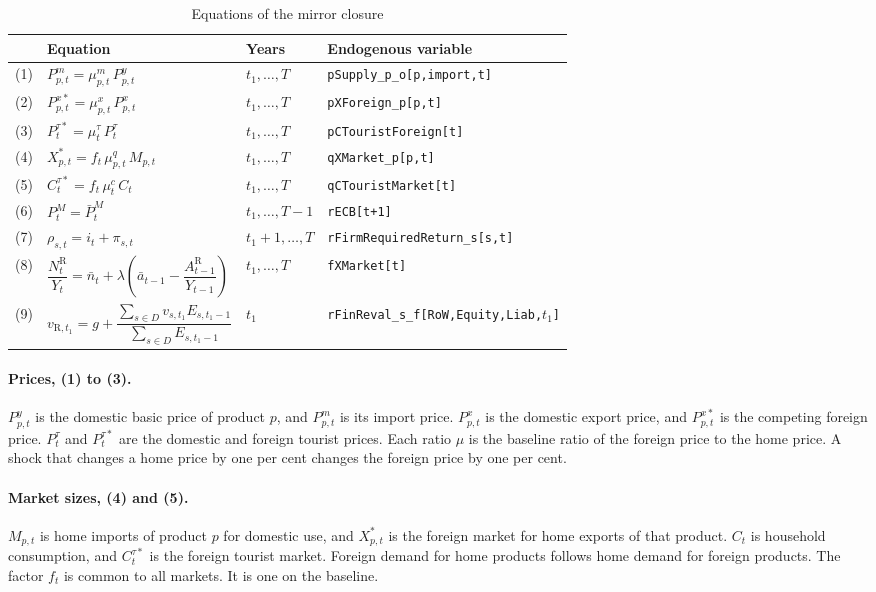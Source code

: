 \documentclass[11pt,a4paper]{article}
\newcommand{\code}[1]{\texttt{#1}}
\newcommand{\row}{\mathrm{R}}
\begin{document}
\begin{table}[ht]
\centering
\small
\caption{Equations of the mirror closure}
\label{tab:equations}
\begin{tabular}{@{}llll@{}}
\toprule
 & Equation & Years & Endogenous variable \\
\midrule
(1) & $P^{m}_{p,t} = \mu^{m}_{p,t}\, P^{y}_{p,t}$ & $t_1,\dots,T$ & \code{pSupply\_p\_o[p,import,t]} \\[2pt]
(2) & $P^{x*}_{p,t} = \mu^{x}_{p,t}\, P^{x}_{p,t}$ & $t_1,\dots,T$ & \code{pXForeign\_p[p,t]} \\[2pt]
(3) & $P^{\tau*}_{t} = \mu^{\tau}_{t}\, P^{\tau}_{t}$ & $t_1,\dots,T$ & \code{pCTouristForeign[t]} \\[2pt]
(4) & $X^{*}_{p,t} = f_t\, \mu^{q}_{p,t}\, M_{p,t}$ & $t_1,\dots,T$ & \code{qXMarket\_p[p,t]} \\[2pt]
(5) & $C^{\tau*}_{t} = f_t\, \mu^{c}_{t}\, C_{t}$ & $t_1,\dots,T$ & \code{qCTouristMarket[t]} \\[2pt]
(6) & $P^{M}_{t} = \bar{P}^{M}_{t}$ & $t_1,\dots,T-1$ & \code{rECB[t+1]} \\[2pt]
(7) & $\rho_{s,t} = i_t + \pi_{s,t}$ & $t_1+1,\dots,T$ & \code{rFirmRequiredReturn\_s[s,t]} \\[2pt]
(8) & $\dfrac{N^{\row}_t}{Y_t} = \bar{n}_t + \lambda \left( \bar{a}_{t-1} - \dfrac{A^{\row}_{t-1}}{Y_{t-1}} \right)$ & $t_1,\dots,T$ & \code{fXMarket[t]} \\[8pt]
(9) & $v_{\row,t_1} = g + \dfrac{\sum_{s \in D} v_{s,t_1} E_{s,t_1-1}}{\sum_{s \in D} E_{s,t_1-1}}$ & $t_1$ & \code{rFinReval\_s\_f[RoW,Equity,Liab,$t_1$]} \\
\bottomrule
\end{tabular}
\end{table}

\paragraph{Prices, (1) to (3).}
$P^{y}_{p,t}$ is the domestic basic price of product $p$, and $P^{m}_{p,t}$ is its import price.
$P^{x}_{p,t}$ is the domestic export price, and $P^{x*}_{p,t}$ is the competing foreign price.
$P^{\tau}_t$ and $P^{\tau*}_t$ are the domestic and foreign tourist prices.
Each ratio $\mu$ is the baseline ratio of the foreign price to the home price.
A shock that changes a home price by one per cent changes the foreign price by one per cent.

\paragraph{Market sizes, (4) and (5).}
$M_{p,t}$ is home imports of product $p$ for domestic use, and $X^{*}_{p,t}$ is the foreign market for home exports of that product.
$C_t$ is household consumption, and $C^{\tau*}_t$ is the foreign tourist market.
Foreign demand for home products follows home demand for foreign products.
The factor $f_t$ is common to all markets. It is one on the baseline.
\end{document}
